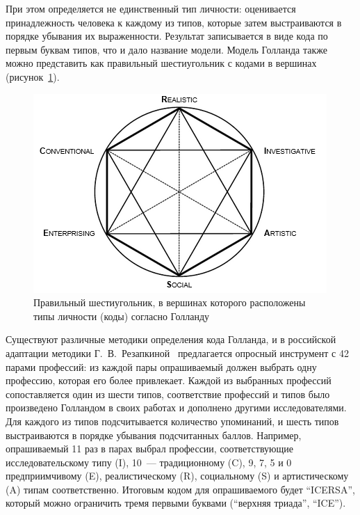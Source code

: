 При этом определяется не единственный тип личности: оценивается принадлежность человека к каждому из типов, которые затем выстраиваются в порядке убывания их выраженности. Результат записывается в виде кода по первым буквам типов, что и дало название модели. Модель Голланда также можно представить как правильный шестиугольник с кодами в вершинах (рисунок~\ref{fig:hexagon_RIASEC}).

\begin{figure}
    \centering
    \includegraphics[width=0.65\linewidth]{figures/hexagon_RIASEC.png}
    \caption{Правильный шестиугольник, в вершинах которого расположены типы личности (коды) согласно Голланду\protect\footnotemark}
    \label{fig:hexagon_RIASEC}
\end{figure}


Существуют различные методики определения кода Голланда, и в российской адаптации методики Г.~В.~Резапкиной~\cite{Rezapkina} предлагается опросный инструмент с 42 парами профессий: из каждой пары опрашиваемый должен выбрать одну профессию, которая его более привлекает. Каждой из выбранных профессий сопоставляется один из шести типов, соответствие профессий и типов было произведено Голландом в своих работах и дополнено другими исследователями. Для каждого из типов подсчитывается количество упоминаний, и шесть типов выстраиваются в порядке убывания подсчитанных баллов. Например, опрашиваемый 11 раз в парах выбрал профессии, соответствующие исследовательскому типу (I), 10~--- традиционному (C), 9, 7, 5 и 0 предприимчивому (E), реалистическому (R), социальному (S) и артистическому (A) типам соответственно. Итоговым кодом для опрашиваемого будет \enquote{ICERSA}, который можно ограничить тремя первыми буквами (\enquote{верхняя триада}, \enquote{ICE}).

